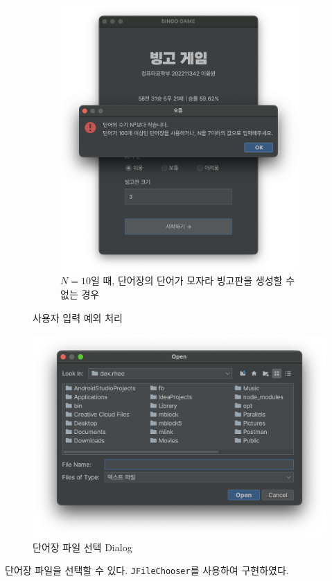 \begin{figure}[H]
\begin{subfigure}{\textwidth}
        \includegraphics[scale=0.4]{img/main-word-list-size-error.png}
        \caption{$N = 10$일 때, 단어장의 단어가 모자라 빙고판을 생성할 수 없는 경우}
    \end{subfigure}
    \caption{사용자 입력 예외 처리}
\end{figure}

\begin{figure}[H]
    \centering
    \includegraphics[scale=0.35]{img/file-chooser.png}
    \caption{단어장 파일 선택 Dialog}
\end{figure}
단어장 파일을 선택할 수 있다.
\texttt{JFileChooser}를 사용하여 구현하였다.

